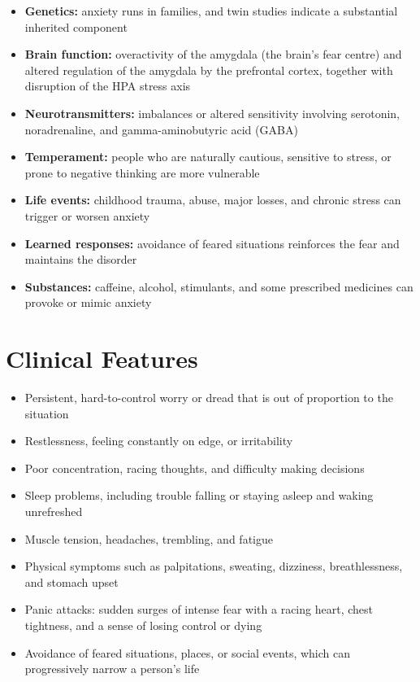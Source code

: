\begin{itemize}
    \item \textbf{Genetics:} anxiety runs in families, and twin studies indicate a substantial inherited component
    \item \textbf{Brain function:} overactivity of the amygdala (the brain's fear centre) and altered regulation of the amygdala by the prefrontal cortex, together with disruption of the HPA stress axis
    \item \textbf{Neurotransmitters:} imbalances or altered sensitivity involving serotonin, noradrenaline, and gamma-aminobutyric acid (GABA)
    \item \textbf{Temperament:} people who are naturally cautious, sensitive to stress, or prone to negative thinking are more vulnerable
    \item \textbf{Life events:} childhood trauma, abuse, major losses, and chronic stress can trigger or worsen anxiety
    \item \textbf{Learned responses:} avoidance of feared situations reinforces the fear and maintains the disorder
    \item \textbf{Substances:} caffeine, alcohol, stimulants, and some prescribed medicines can provoke or mimic anxiety
\end{itemize}

\section*{Clinical Features}
\begin{itemize}
    \item Persistent, hard-to-control worry or dread that is out of proportion to the situation
    \item Restlessness, feeling constantly on edge, or irritability
    \item Poor concentration, racing thoughts, and difficulty making decisions
    \item Sleep problems, including trouble falling or staying asleep and waking unrefreshed
    \item Muscle tension, headaches, trembling, and fatigue
    \item Physical symptoms such as palpitations, sweating, dizziness, breathlessness, and stomach upset
    \item Panic attacks: sudden surges of intense fear with a racing heart, chest tightness, and a sense of losing control or dying
    \item Avoidance of feared situations, places, or social events, which can progressively narrow a person's life
\end{itemize}

